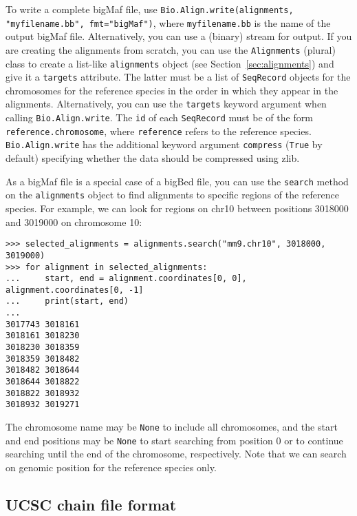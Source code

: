 To write a complete bigMaf file, use \verb|Bio.Align.write(alignments, "myfilename.bb", fmt="bigMaf")|, where \verb|myfilename.bb| is the name of the output bigMaf file. Alternatively, you can use a (binary) stream for output. If you are creating the alignments from scratch, you can use the \verb|Alignments| (plural) class to create a list-like \verb|alignments| object (see Section~\ref{sec:alignments}) and give it a \verb|targets| attribute. The latter must be a list of \verb|SeqRecord| objects for the chromosomes for the reference species in the order in which they appear in the alignments. Alternatively, you can use the \verb|targets| keyword argument when calling \verb|Bio.Align.write|. The \verb|id| of each \verb|SeqRecord| must be of the form \verb|reference.chromosome|, where \verb|reference| refers to the reference species. \verb|Bio.Align.write| has the additional keyword argument \verb|compress| (\verb|True| by default) specifying whether the data should be compressed using zlib.

As a bigMaf file is a special case of a bigBed file, you can use the \verb|search| method on the \verb|alignments| object to find alignments to specific regions of the reference species. For example, we can look for regions on chr10 between positions 3018000 and 3019000 on chromosome 10:

\begin{verbatim}
>>> selected_alignments = alignments.search("mm9.chr10", 3018000, 3019000)
>>> for alignment in selected_alignments:
...     start, end = alignment.coordinates[0, 0], alignment.coordinates[0, -1]
...     print(start, end)
...
3017743 3018161
3018161 3018230
3018230 3018359
3018359 3018482
3018482 3018644
3018644 3018822
3018822 3018932
3018932 3019271
\end{verbatim}
The chromosome name may be \verb|None| to include all chromosomes, and the start and end positions may be \verb|None| to start searching from position 0 or to continue searching until the end of the chromosome, respectively. Note that we can search on genomic position for the reference species only.

\subsection{UCSC chain file format}
\label{subsec:align_chain}

